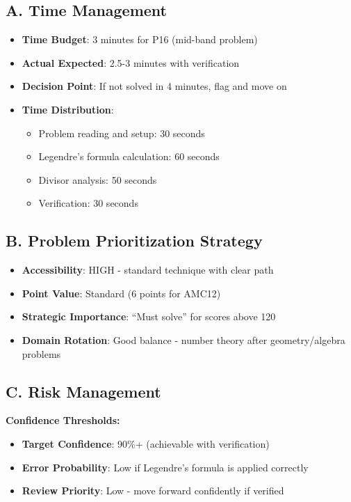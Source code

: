 \documentclass[]{article}
\begin{document}
\begin{competitionbox}
\subsection*{A. Time Management}
\begin{itemize}[leftmargin=*]
    \item \textbf{Time Budget}: 3 minutes for P16 (mid-band problem)
    \item \textbf{Actual Expected}: 2.5-3 minutes with verification
    \item \textbf{Decision Point}: If not solved in 4 minutes, flag and move on
    \item \textbf{Time Distribution}:
    \begin{itemize}
        \item Problem reading and setup: 30 seconds
        \item Legendre's formula calculation: 60 seconds
        \item Divisor analysis: 50 seconds
        \item Verification: 30 seconds
    \end{itemize}
\end{itemize}

\subsection*{B. Problem Prioritization Strategy}
\begin{itemize}[leftmargin=*]
    \item \textbf{Accessibility}: HIGH - standard technique with clear path
    \item \textbf{Point Value}: Standard (6 points for AMC12)
    \item \textbf{Strategic Importance}: ``Must solve'' for scores above 120
    \item \textbf{Domain Rotation}: Good balance - number theory after geometry/algebra problems
\end{itemize}

\subsection*{C. Risk Management}

\textbf{Confidence Thresholds:}
\begin{itemize}[leftmargin=*]
    \item \textbf{Target Confidence}: 90\%+ (achievable with verification)
    \item \textbf{Error Probability}: Low if Legendre's formula is applied correctly
    \item \textbf{Review Priority}: Low - move forward confidently if verified
\end{itemize}


\end{competitionbox}
\end{document}
